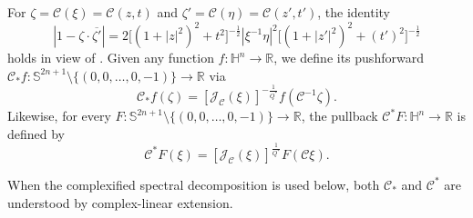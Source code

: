 \documentclass[10pt,a4paper]{amsart}
\begin{document}
For $\zeta=\mathcal{C}(\xi)=\mathcal{C}(z,t)$ and $\zeta'=\mathcal{C}(\eta)=\mathcal{C}(z',t')$, the identity
\begin{equation*}
 |1-\zeta\cdot\overline{\zeta'}|=2\big[(1+|z|^2)^2+t^2\big]^{-\frac{1}{2}}|\xi^{-1}\eta|^2\big[(1+|z'|^2)^2+(t')^2\big]^{-\frac{1}{2}}
\end{equation*}
holds in view of \cite[Appendix A]{FL12}.
 Given any function $f:\mathbb{H}^n\rightarrow \mathbb{R}$, we define its pushforward $\mathcal{C}_*f:\mathbb{S}^{2n+1}\setminus \{(0,0,\ldots,0,-1)\}\rightarrow \mathbb{R}$ via
\begin{equation*}
 \mathcal{C}_*f(\zeta)=[\mathcal{J}_\mathcal{C}(\xi)]^{-\frac{1}{Q^{\ast}}}f(\mathcal{C}^{-1}\zeta).
\end{equation*}
Likewise, for every $F:\mathbb{S}^{2n+1}\setminus \{(0,0,\ldots,0,-1)\}\rightarrow \mathbb{R}$, the pullback
$\mathcal{C}^*F:\mathbb{H}^n\rightarrow \mathbb{R}$ is defined by
\begin{equation*}
 \mathcal{C}^*F(\xi)=[\mathcal{J}_\mathcal{C}(\xi)]^{\frac{1}{Q^{\ast}}}F(\mathcal{C}\xi).
\end{equation*}

{When the complexified spectral decomposition is used below, both $\mathcal{C}_*$ and $\mathcal{C}^*$ are understood by complex-linear extension.}
\end{document}
